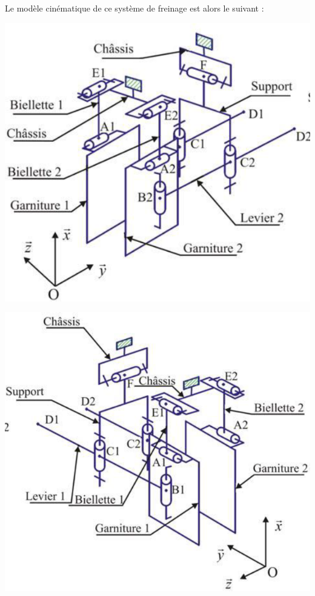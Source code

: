 \documentclass[10pt,fleqn]{article} %
\begin{document}
\begin{multicols}{2}
Le modèle cinématique de ce système de freinage est alors le suivant :

\begin{center}
\includegraphics[width=\linewidth]{images/fig_06.png}
\end{center}


\begin{center}
\includegraphics[width=\linewidth]{images/fig_07.png}
\end{center}


\end{multicols}
\end{document}
